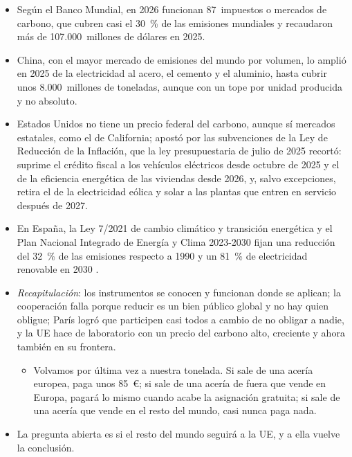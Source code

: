 \documentclass[11pt]{article}
\begin{document}
\begin{itemize}
\item Según el Banco Mundial, en 2026 funcionan 87~impuestos o mercados de carbono, que cubren casi el 30~\% de las emisiones mundiales y recaudaron más de 107.000~millones de dólares en 2025\nocite{BM2026StateTrends}.
\item China, con el mayor mercado de emisiones del mundo por volumen, lo amplió en 2025 de la electricidad al acero, el cemento y el aluminio, hasta cubrir unos 8.000~millones de toneladas, aunque con un tope por unidad producida y no absoluto\nocite{ICAP2025China}.
\item Estados Unidos no tiene un precio federal del carbono, aunque sí mercados estatales, como el de California; apostó por las subvenciones de la Ley de Reducción de la Inflación\nocite{EEUU2022IRA}, que la ley presupuestaria de julio de 2025 recortó: suprime el crédito fiscal a los vehículos eléctricos desde octubre de 2025 y el de la eficiencia energética de las viviendas desde 2026, y, salvo excepciones, retira el de la electricidad eólica y solar a las plantas que entren en servicio después de 2027\nocite{EEUU2025PL11921}.
\item En España, la Ley 7/2021 de cambio climático y transición energética\nocite{BOE2021Ley7} y el Plan Nacional Integrado de Energía y Clima 2023-2030 fijan una reducción del 32~\% de las emisiones respecto a 1990 y un 81~\% de electricidad renovable en 2030\nocite{MITECO2024PNIEC} .
\end{itemize}

\begin{itemize}
\item \emph{Recapitulación}: los instrumentos se conocen y funcionan donde se aplican; la cooperación falla porque reducir es un bien público global y no hay quien obligue; París logró que participen casi todos a cambio de no obligar a nadie, y la UE hace de laboratorio con un precio del carbono alto, creciente y ahora también en su frontera.
  \begin{itemize}
  \item Volvamos por última vez a nuestra tonelada. Si sale de una acería europea, paga unos 85~€; si sale de una acería de fuera que vende en Europa, pagará lo mismo cuando acabe la asignación gratuita; si sale de una acería que vende en el resto del mundo, casi nunca paga nada.
  \end{itemize}
\item La pregunta abierta es si el resto del mundo seguirá a la UE, y a ella vuelve la conclusión.
\end{itemize}
\end{document}

